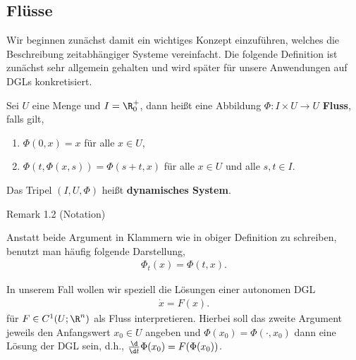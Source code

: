 \documentclass[letterpaper,10pt,english]{jupyterBook}
\begin{document}
\subsection{Flüsse}
\label{\detokenize{ode/fluesse:flusse}}
Wir beginnen zunächst damit ein wichtiges Konzept einzuführen, welches die Beschreibung zeitabhängiger Systeme vereinfacht. Die folgende Definition ist zunächst sehr allgemein gehalten und wird später für unsere Anwendungen auf DGLs konkretisiert.
\label{ode/fluesse:def:Fluss}
\begin{definition}{}{}



Sei \(U\) eine Menge und \(I=\R^+_0\), dann heißt eine Abbildung \(\Phi:I\times U\rightarrow U\) \textbf{Fluss}, falls gilt,
\begin{enumerate}

\item {} 
\(\Phi(0, x) = x\) für alle \(x\in U\),

\item {} 
\(\Phi(t, \Phi(x,s)) = \Phi(s + t, x)\) für alle \(x\in U\) und alle \(s,t\in I\).

\end{enumerate}

Das Tripel \((I, U, \Phi)\) heißt \textbf{dynamisches System}.
\end{definition}
\label{ode/fluesse:remark-1}
\begin{emphBox}{}{}{Remark 1.2 (Notation)}



Anstatt beide Argument in Klammern wie in obiger Definition zu schreiben, benutzt man häufig folgende Darstellung,
\begin{align*}
\Phi_t(x) = \Phi(t, x).
\end{align*}\end{emphBox}

In unserem Fall wollen wir speziell die Lösungen einer autonomen DGL
\begin{align*}
\dot{x} = F(x).
\end{align*}
für \(F\in C^1(U;\R^n)\) als Fluss interpretieren. Hierbei soll das zweite Argument jeweils den Anfangswert
\(x_0\in U\) angeben und \(\Phi(x_0) = \Phi(\cdot, x_0)\) dann eine Lösung der DGL sein, d.h., \(\frac{\d}{\d t} \Phi(x_0) = F(\Phi(x_0))\).
\end{document}
